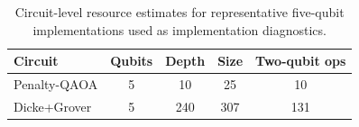 \begin{table}[t]
\centering
\caption{Circuit-level resource estimates for representative five-qubit implementations used as implementation diagnostics.}
\label{tab:circuit-resources}
\begin{tabular}{lcccc}
\toprule
Circuit & Qubits & Depth & Size & Two-qubit ops\\
\midrule
Penalty-QAOA & 5 & 10 & 25 & 10\\
Dicke+Grover & 5 & 240 & 307 & 131\\
\bottomrule
\end{tabular}
\end{table}
